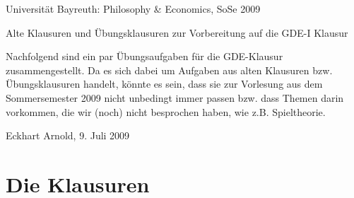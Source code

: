 \documentclass[11pt, a4paper, german]{article}
\numberwithin {equation}{section}
\begin{document}
\begin{center}
{\large Universität Bayreuth: Philosophy \& Economics, SoSe 2009}
\end{center}
\vspace{0.4em}
\begin{center}
{\huge Alte Klausuren und Übungsklausuren zur Vorbereitung auf die GDE-I Klausur}
\end{center}
\vspace{0.0em}

Nachfolgend sind ein par Übungsaufgaben für die GDE-Klausur zusammengestellt. 
Da es sich dabei um Aufgaben aus alten Klausuren bzw. Übungsklausuren handelt,
könnte es sein, dass sie zur Vorlesung aus dem Sommersemester 2009 nicht 
unbedingt immer passen bzw. dass Themen darin vorkommen, die wir (noch) 
nicht besprochen haben, wie z.B. Spieltheorie.

\begin{flushright}
Eckhart Arnold, 9. Juli 2009
\end {flushright}

\tableofcontents

\section{Die Klausuren}


\newpage


\newpage


\end{document}
